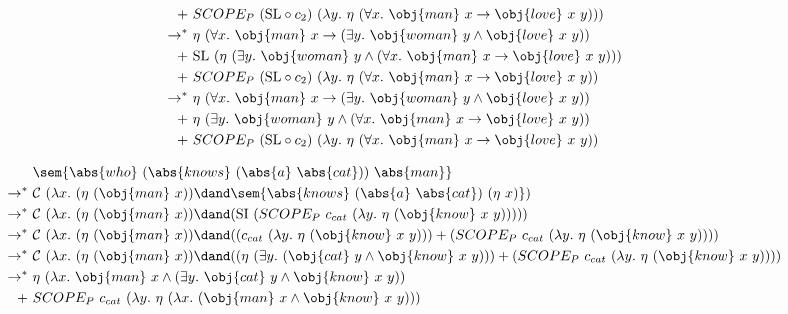 \begin{align*}
  +\ & SCOPE_P\ (\mathrm{SL} \circ c_2)\ (\lambda y.\ \eta\ (\forall x.\
  \obj{man}\ x \rightarrow \obj{love}\ x\ y))) \\
  \rightarrow^*\ & \eta\ (\forall x.\ \obj{man}\ x
  \rightarrow (\exists y.\ \obj{woman}\ y \land \obj{love}\ x\ y)) \\
  +\ & \mathrm{SL}\ (\eta\ (\exists y.\ \obj{woman}\ y \land (\forall x.\
  \obj{man}\ x \rightarrow \obj{love}\ x\ y))) \\
  +\ & SCOPE_P\ (\mathrm{SL} \circ c_2)\ (\lambda y.\ \eta\ (\forall x.\
  \obj{man}\ x \rightarrow \obj{love}\ x\ y)) \\
  \rightarrow^*\ & \eta\ (\forall x.\ \obj{man}\ x
  \rightarrow (\exists y.\ \obj{woman}\ y \land \obj{love}\ x\ y)) \\
  +\ & \eta\ (\exists y.\ \obj{woman}\ y \land (\forall x.\
  \obj{man}\ x \rightarrow \obj{love}\ x\ y)) \\
  +\ & SCOPE_P\ (\mathrm{SL} \circ c_2)\ (\lambda y.\ \eta\ (\forall x.\
  \obj{man}\ x \rightarrow \obj{love}\ x\ y)) \\
\end{align*}

\begin{align*}
  & \sem{\abs{who}\ (\abs{knows}\ (\abs{a}\ \abs{cat}))\ \abs{man}} \\
  \rightarrow^*\ & \mathcal{C}\ (\lambda x.\ (\eta\ (\obj{man}\ x)) \dand
  \sem{\abs{knows}\ (\abs{a}\ \abs{cat})\ (\eta\ x)}) \\
  \rightarrow^*\ & \mathcal{C}\ (\lambda x.\ (\eta\ (\obj{man}\ x)) \dand
  (\mathrm{SI}\ (SCOPE_P\ c_{cat}\ (\lambda y.\ \eta\ (\obj{know}\ x\ y))))) \\
  \rightarrow^*\ & \mathcal{C}\ (\lambda x.\ (\eta\ (\obj{man}\ x)) \dand
  ((c_{cat}\ (\lambda y.\ \eta\ (\obj{know}\ x\ y))) +
  (SCOPE_P\ c_{cat}\ (\lambda y.\ \eta\ (\obj{know}\ x\ y)))) \\
  \rightarrow^*\ & \mathcal{C}\ (\lambda x.\ (\eta\ (\obj{man}\ x)) \dand
  ((\eta\ (\exists y.\ (\obj{cat}\ y \land \obj{know}\ x\ y))) +
  (SCOPE_P\ c_{cat}\ (\lambda y.\ \eta\ (\obj{know}\ x\ y)))) \\
  \rightarrow^*\ & \eta\ (\lambda x.\ \obj{man}\ x \land
  (\exists y.\ \obj{cat}\ y \land \obj{know}\ x\ y)) \\
  +\ & SCOPE_P\ c_{cat}\ (\lambda y.\ \eta\ (\lambda x.\ (\obj{man}\ x \land \obj{know}\ x\ y))) \\
\end{align*}

